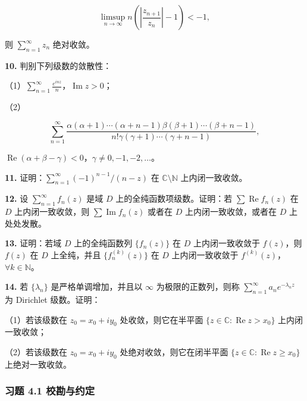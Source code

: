 \documentclass[11pt,a4paper]{article}
\begin{document}
\[
\limsup_{n\to\infty}n\left(\left|\frac{z_{n+1}}{z_n}\right|-1\right)<-1,
\]

则 \(\sum_{n=1}^{\infty}z_n\) 绝对收敛。

\par{}
\noindent\textbf{10.} 判别下列级数的敛散性：

（1）\(\displaystyle\sum_{n=1}^{\infty}\frac{e^{inz}}n\)，\(\operatorname{Im}z>0\)；

（2）

\[
\sum_{n=1}^{\infty}
\frac{\alpha(\alpha+1)\cdots(\alpha+n-1)\beta(\beta+1)\cdots(\beta+n-1)}
{n!\gamma(\gamma+1)\cdots(\gamma+n-1)},
\]

\(\operatorname{Re}(\alpha+\beta-\gamma)<0\)，\(\gamma\ne0,-1,-2,\ldots\)。

\par{}
\noindent\textbf{11.} 证明：\(\sum_{n=1}^{\infty}(-1)^{n-1}/(n-z)\) 在
\(\mathbb C\setminus\mathbb N\) 上内闭一致收敛。

\par{}
\noindent\textbf{12.} 设 \(\sum_{n=1}^{\infty}f_n(z)\) 是域 \(D\)
上的全纯函数项级数。证明：若 \(\sum\operatorname{Re}f_n(z)\) 在 \(D\)
上内闭一致收敛，则 \(\sum\operatorname{Im}f_n(z)\) 或者在 \(D\)
上内闭一致收敛，或者在 \(D\) 上处处发散。

\par{}
\noindent\textbf{13.} 证明：若域 \(D\) 上的全纯函数列 \(\{f_n(z)\}\) 在 \(D\)
上内闭一致收敛于 \(f(z)\)，则 \(f(z)\) 在 \(D\) 上全纯，并且
\(\{f_n^{(k)}(z)\}\) 在 \(D\) 上内闭一致收敛于
\(f^{(k)}(z)\)，\(\forall k\in\mathbb N\)。

\par{}
\noindent\textbf{14.} 若 \(\{\lambda_n\}\) 是严格单调增加，并且以 \(\infty\)
为极限的正数列，则称 \(\sum_{n=1}^{\infty}a_ne^{-\lambda_nz}\) 为
Dirichlet 级数。证明：

（1）若该级数在 \(z_0=x_0+iy_0\) 处收敛，则它在半平面
\(\{z\in\mathbb C:\operatorname{Re}z>x_0\}\) 上内闭一致收敛；

（2）若该级数在 \(z_0=x_0+iy_0\) 处绝对收敛，则它在闭半平面
\(\{z\in\mathbb C:\operatorname{Re}z\ge x_0\}\) 上绝对一致收敛。

\subsubsection{习题 4.1
校勘与约定}\label{ch04-practice-ux4e60ux9898-41-ux6821ux52d8ux4e0eux7ea6ux5b9a}
\end{document}
